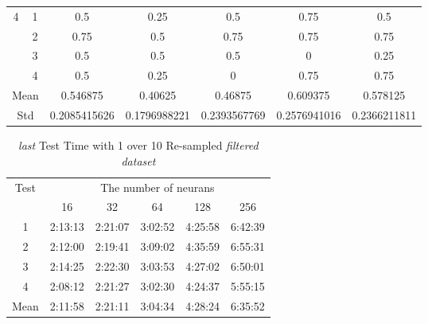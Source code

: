 \documentclass[draft,dvipsnames]{drexel-thesis}
\begin{document}
\begin{thesis}
\begin{table}[!t]
\begin{tabular}{|c|c|c|c|c|c|c|}
\multirow{4}{*}{4}    & 1                   & 0.5          & 0.25         & 0.5          & 0.75         & 0.5          \\ \cline{2-7}
                      & 2                   & 0.75         & 0.5          & 0.75         & 0.75         & 0.75         \\ \cline{2-7}
                      & 3                   & 0.5          & 0.5          & 0.5          & 0            & 0.25         \\ \cline{2-7}
                      & 4                   & 0.5          & 0.25         & 0            & 0.75         & 0.75         \\ \hline
\multicolumn{2}{|c|}{Mean}                  & 0.546875     & 0.40625      & 0.46875      & 0.609375     & 0.578125     \\ \hline
\multicolumn{2}{|c|}{Std}                   & 0.2085415626 & 0.1796988221 & 0.2393567769 & 0.2576941016 & 0.2366211811 \\ \hline
\end{tabular}
\end{table}

\begin{table}[!t]
\centering
\caption{{\em last} Test Time with 1 over 10 Re-sampled {\em filtered dataset}}
\label{tbl:last_1_10_time}
\begin{tabular}{|c|c|c|c|c|c|}
\hline
\multirow{2}{*}{Test}      & \multicolumn{5}{c|}{The number of neurans}                                                                                                               \\ \cline{2-6}
                           & 16                           & 32                           & 64                           & 128                          & 256                          \\ \hline
1                          & 2:13:13                      & 2:21:07                      & 3:02:52                      & 4:25:58                      & 6:42:39                      \\ \hline
2                          & 2:12:00                      & 2:19:41                      & 3:09:02                      & 4:35:59                      & 6:55:31                      \\ \hline
3                          & 2:14:25                      & 2:22:30                      & 3:03:53                      & 4:27:02                      & 6:50:01                      \\ \hline
4                          & 2:08:12                      & 2:21:27                      & 3:02:30                      & 4:24:37                      & 5:55:15                      \\ \hline
\multicolumn{1}{|l|}{Mean} & \multicolumn{1}{l|}{2:11:58} & \multicolumn{1}{l|}{2:21:11} & \multicolumn{1}{l|}{3:04:34} & \multicolumn{1}{l|}{4:28:24} & \multicolumn{1}{l|}{6:35:52} \\ \hline
\end{tabular}
\end{table}


\end{thesis}
\end{document}
